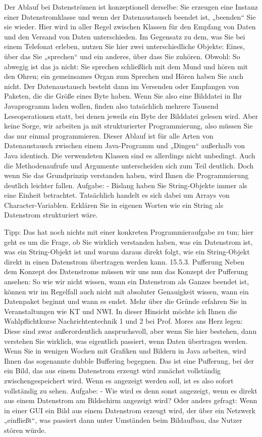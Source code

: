 Der Ablauf bei Datenströmen ist konzeptionell derselbe: Sie erzeugen eine Instanz einer Datenstromklasse und wenn der Datenaustausch beendet ist, „beenden“ Sie sie wieder.
Hier wird in aller Regel zwischen Klassen für den Empfang von Daten und den Versand von Daten unterschieden. Im Gegensatz zu dem, was Sie bei einem Telefonat erleben, nutzen Sie hier zwei unterschiedliche Objekte: Eines, über das Sie „sprechen“ und ein anderes, über dass Sie zuhören. Obwohl: So abwegig ist das ja nicht: Sie sprechen schließlich mit dem Mund und hören mit den Ohren; ein gemeinsames Organ zum Sprechen und Hören haben Sie auch nicht.
Der Datenaustausch besteht dann im Versenden oder Empfangen von Paketen, die die Größe eines Byte haben. Wenn Sie also eine Bilddatei in Ihr Javaprogramm laden wollen, finden also tatsächlich mehrere Tausend Leseoperationen statt, bei denen jeweils ein Byte der Bilddatei gelesen wird. Aber keine Sorge, wir arbeiten ja mit strukturierter Programmierung, also müssen Sie das nur einmal programmieren.
Dieser Ablauf ist für alle Arten von Datenaustausch zwischen einem Java-Programm und „Dingen“ außerhalb von Java identisch. Die verwendeten Klassen sind es allerdings nicht unbedingt. Auch die Methodenaufrufe und Argumente unterscheiden sich zum Teil deutlich. Doch wenn Sie das Grundprinzip verstanden haben, wird Ihnen die Programmierung deutlich leichter fallen.
Aufgabe:
-	Bislang haben Sie String-Objekte immer als eine Einheit betrachtet. Tatsächlich handelt es sich dabei um Arrays von Character-Variablen. Erklären Sie in eigenen Worten wie ein String als Datenstrom strukturiert wäre.

Tipp: Das hat noch nichts mit einer konkreten Programmieraufgabe zu tun; hier geht es um die Frage, ob Sie wirklich verstanden haben, was ein Datenstrom ist, was ein String-Objekt ist und warum daraus direkt folgt, wie ein String-Objekt direkt in einen Datenstrom übertragen werden kann.
15.5.3.	Pufferung
Neben dem Konzept des Datenstroms müssen wir uns nun das Konzept der Pufferung ansehen: So wie wir nicht wissen, wann ein Datenstrom als Ganzes beendet ist, können wir im Regelfall auch nicht mit absoluter Genauigkeit wissen, wann ein Datenpaket beginnt und wann es endet. Mehr über die Gründe erfahren Sie in Veranstaltungen wie KT und NWI. In dieser Hinsicht möchte ich Ihnen die Wahlpflichtkurse Nachrichtentechnik 1 und 2 bei Prof. Mores ans Herz legen: Diese sind zwar außerordentlich anspruchsvoll, aber wenn Sie hier bestehen, dann verstehen Sie wirklich, was eigentlich passiert, wenn Daten übertragen werden.
Wenn Sie in wenigen Wochen mit Grafiken und Bildern in Java arbeiten, wird Ihnen das sogenannte dubble Buffering begegnen. Das ist eine Pufferung, bei der ein Bild, das aus einem Datenstrom erzeugt wird zunächst vollständig zwischengespeichert wird. Wenn es angezeigt werden soll, ist es also sofort vollständig zu sehen.
Aufgabe:
-	Wie wird es denn sonst angezeigt, wenn es direkt aus einem Datenstrom am Bildschirm angezeigt wird? Oder anders gefragt: Wenn in einer GUI ein Bild aus einem Datenstrom erzeugt wird, der über ein Netzwerk „einfließt“, was passiert dann unter Umständen beim Bildaufbau, das Nutzer stören würde.


